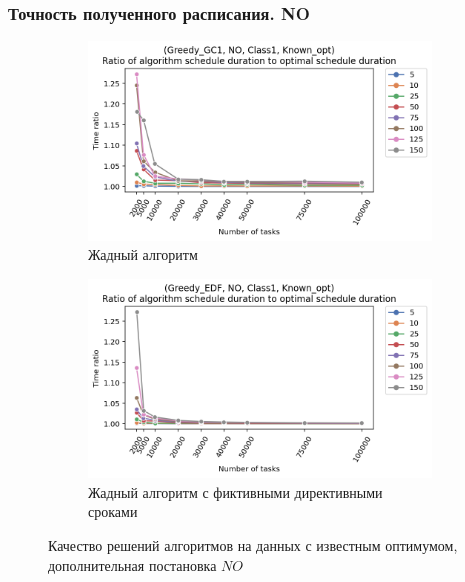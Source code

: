 \begin{frame}
    \frametitle{Точность полученного расписания. NO}
    \begin{figure}
        \begin{subfigure}{0.49\textwidth}
            \includegraphics[width=\textwidth]{imgs/ideal_1/NO/gr_amalgamated.png}
            \caption{Жадный алгоритм}
        \end{subfigure}
        \begin{subfigure}{0.49\textwidth}
            \includegraphics[width=\textwidth]{imgs/ideal_1/NO_EDF/gr_amalgamated.png}
            \caption{Жадный алгоритм с фиктивными директивными сроками}
        \end{subfigure}
        \caption{Качество решений алгоритмов на данных с известным оптимумом,\\ дополнительная постановка $NO$}
    \end{figure}
\end{frame}

